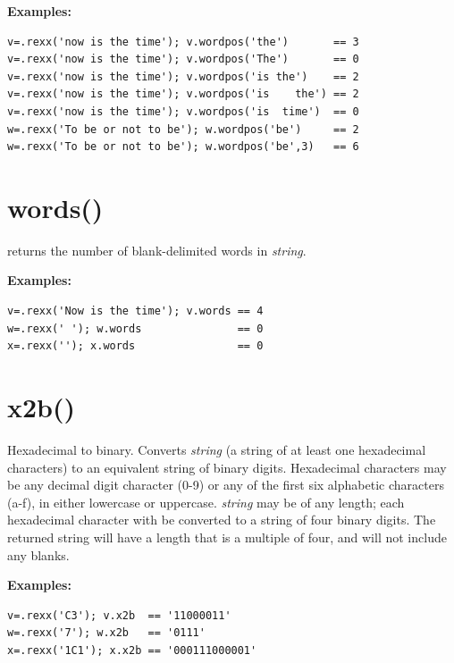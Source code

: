 \textbf{Examples:}
\begin{lstlisting}
v=.rexx('now is the time'); v.wordpos('the')       == 3
v=.rexx('now is the time'); v.wordpos('The')       == 0
v=.rexx('now is the time'); v.wordpos('is the')    == 2
v=.rexx('now is the time'); v.wordpos('is    the') == 2
v=.rexx('now is the time'); v.wordpos('is  time')  == 0
w=.rexx('To be or not to be'); w.wordpos('be')     == 2
w=.rexx('To be or not to be'); w.wordpos('be',3)   == 6
\end{lstlisting}

\section{words()}\label{refwords}
returns the number of blank-delimited words in \emph{string}.
 
\textbf{Examples:}
\begin{lstlisting}
v=.rexx('Now is the time'); v.words == 4
w=.rexx(' '); w.words               == 0
x=.rexx(''); x.words                == 0
\end{lstlisting}

\section{x2b()}\label{refx2b}
Hexadecimal to binary.
Converts \emph{string} (a string of at least one hexadecimal
characters) to an equivalent string of binary digits.
Hexadecimal characters may be any decimal digit character (0-9) or any
of the first six alphabetic characters (a-f), in either lowercase or
uppercase.
 \emph{string} may be of any length; each hexadecimal character
with be converted to a string of four binary digits.
The returned string will have a length that is a multiple of four, and
will not include any blanks.
 
\textbf{Examples:}
\begin{lstlisting}
v=.rexx('C3'); v.x2b  == '11000011'
w=.rexx('7'); w.x2b   == '0111'
x=.rexx('1C1'); x.x2b == '000111000001'
\end{lstlisting}

